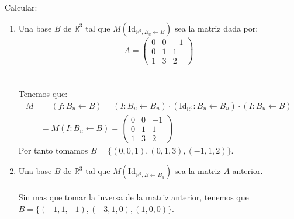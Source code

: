 \begin{ejercicio}
	Calcular:
	\begin{enumerate}
		\item Una base \( B \) de \( \mathbb{R}^3 \) tal que \( M(\text{Id}_{\mathbb{R}^3, B_u \leftarrow B}) \) sea la matriz dada por:
		      \[ A = \begin{pmatrix} 0 & 0 & -1 \\ 0 & 1 & 1 \\ 1 & 3 & 2 \end{pmatrix} \]\\ \\
		      Tenemos que:
		      \begin{align*}
			      M & =(f:B_u \leftarrow B) =(I:B_u \leftarrow B_u)\cdot (\text{Id}_{\mathbb{R}^3}:B_u \leftarrow B_u)\cdot (I:B_u \leftarrow B) \\&= M(I : B_u \leftarrow B) =
			      \begin{pmatrix} 0 & 0 & -1 \\ 0 & 1 & 1 \\ 1 & 3 & 2 \end{pmatrix}
		      \end{align*}
		      Por tanto tomamos $B=\{(0,0,1),(0,1,3),(-1,1,2)\}$.
		\item Una base \( B \) de \( \mathbb{R}^3 \) tal que \( M(\text{Id}_{\mathbb{R}^3, B \leftarrow B_u}) \) sea la matriz \( A \) anterior.
		      \\ \\ Sin mas que tomar la inversa de la matriz anterior, tenemos que \\$B=\{(-1,1,-1),(-3,1,0),(1,0,0)\}$.
	\end{enumerate}
\end{ejercicio}

